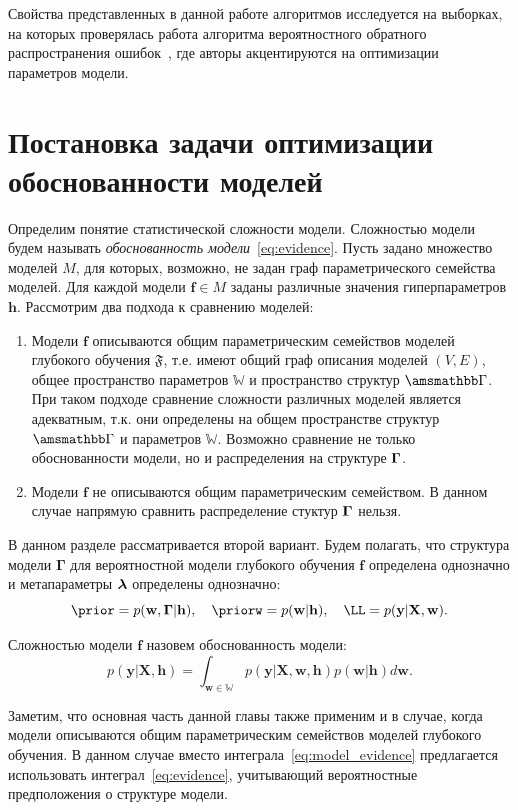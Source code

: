 Свойства представленных в данной работе  алгоритмов исследуется на выборках, на которых проверялась работа алгоритма вероятностного обратного распространения ошибок~\cite{pbp}, где авторы акцентируются на оптимизации параметров модели. 


\section{Постановка задачи оптимизации обоснованности моделей}
Определим понятие статистической сложности модели. Сложностью модели будем называть \textit{обоснованность модели}~\eqref{eq:evidence}.
Пусть задано множество моделей $M$, для которых, возможно, не задан граф параметрического семейства моделей.
Для каждой модели $\mathbf{f} \in {M}$ заданы различные значения гиперпараметров $\mathbf{h}$. 
Рассмотрим два подхода к сравнению моделей:
\begin{enumerate}
\item Модели $\mathbf{f}$ описываются общим параметрическим семействов моделей глубокого обучения $\mathfrak{F}$, т.е. имеют общий граф описания моделей $(V,E)$, общее пространство параметров $\mathbb{W}$ и пространство структур $\Gb$. При таком подходе сравнение сложности различных моделей является  адекватным, т.к. они определены на общем пространстве структур $\Gb$ и параметров $\mathbb{W}$. Возможно сравнение не только обоснованности модели, но и распределения на структуре $\boldsymbol{\Gamma}$.  
\item Модели $\mathbf{f}$  не описываются общим параметрическим семейством. В данном случае напрямую сравнить распределение стуктур $\boldsymbol{\Gamma}$ нельзя.
\end{enumerate}
В данном разделе рассматривается второй вариант. Будем полагать, что структура модели $\boldsymbol{\Gamma}$ для вероятностной модели глубокого обучения $\mathbf{f}$ определена однозначно и метапараметры $\boldsymbol{\lambda}$ определены однозначно:
\[
    \prior = p(\w,\G|\h), \quad \priorw = p(\w|\h),\quad    \LL = p(\y|\X,\w).
\]

\begin{defin} Сложностью модели $\mathbf{f}$ назовем обоснованность модели:
\begin{equation}
\label{eq:model_evidence}
	p(\mathbf{y}|\mathbf{X},\mathbf{h}) = \int_{\mathbf{w} \in \mathbb{W}} p(\mathbf{y}|\mathbf{X},\mathbf{w}, \mathbf{h})p(\mathbf{w}|\mathbf{h})d\mathbf{w}.
\end{equation}
\end{defin}

Заметим, что основная часть данной главы также применим и в случае, когда модели описываются общим параметрическим семействов моделей глубокого обучения. В данном случае вместо интеграла~\eqref{eq:model_evidence} предлагается использовать интеграл~\eqref{eq:evidence}, учитывающий вероятностные предположения о структуре модели.


